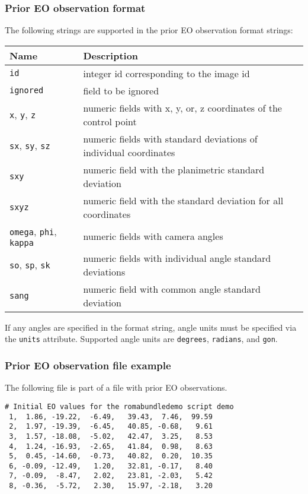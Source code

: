 \documentclass{article}
\begin{document}
\subsubsection{Prior EO observation format}
\label{sec:eoFormat}
The following strings are supported in the prior EO observation format
strings:
\begin{center}
\begin{tabular}{l|l}
Name & Description\\
\hline
\texttt{id} & integer id corresponding to the image id\\
\texttt{ignored} & field to be ignored\\
\texttt{x}, \texttt{y}, \texttt{z} & numeric fields with x, y, or, z coordinates of the control point\\
\texttt{sx}, \texttt{sy}, \texttt{sz} & numeric fields with standard deviations of individual coordinates\\
\texttt{sxy} & numeric field with the planimetric standard deviation\\
\texttt{sxyz} & numeric field with the standard deviation for all coordinates\\
\texttt{omega}, \texttt{phi}, \texttt{kappa} & numeric fields with camera angles\\
\texttt{so}, \texttt{sp}, \texttt{sk} & numeric fields with individual angle standard deviations\\
\texttt{sang} & numeric field with common angle standard deviation\\
\end{tabular}
\end{center}

If any angles are specified in the format string, angle units must be
specified via the \texttt{units} attribute. Supported angle units are
\texttt{degrees}, \texttt{radians}, and \texttt{gon}.
\subsubsection{Prior EO observation file example}
\label{sec:eoExample}
The following file is part of a file with prior EO observations.
\begin{verbatim}
# Initial EO values for the romabundledemo script demo
 1,  1.86, -19.22,  -6.49,   39.43,  7.46,  99.59
 2,  1.97, -19.39,  -6.45,   40.85, -0.68,   9.61
 3,  1.57, -18.08,  -5.02,   42.47,  3.25,   8.53
 4,  1.24, -16.93,  -2.65,   41.84,  0.98,   8.63
 5,  0.45, -14.60,  -0.73,   40.82,  0.20,  10.35
 6, -0.09, -12.49,   1.20,   32.81, -0.17,   8.40
 7, -0.09,  -8.47,   2.02,   23.81, -2.03,   5.42
 8, -0.36,  -5.72,   2.30,   15.97, -2.18,   3.20
\end{verbatim}
\end{document}
